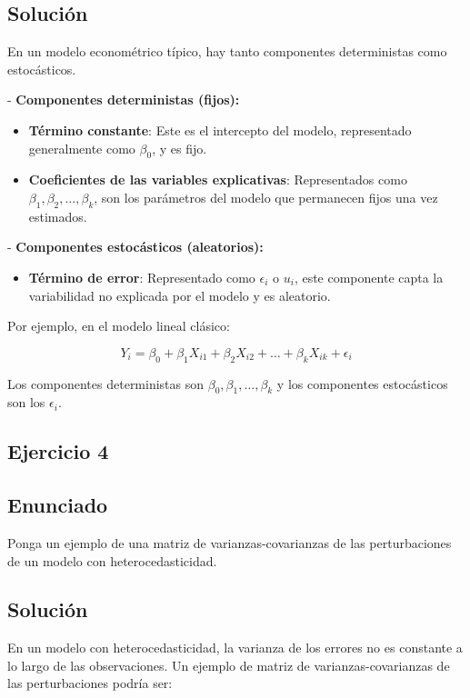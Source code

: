 \documentclass[a4paper,12pt]{article}
\begin{document}
\subsection*{Solución}
En un modelo econométrico típico, hay tanto componentes deterministas como estocásticos.

- \textbf{Componentes deterministas (fijos):}
\begin{itemize}
    \item \textbf{Término constante}: Este es el intercepto del modelo, representado generalmente como \(\beta_0\), y es fijo.
    \item \textbf{Coeficientes de las variables explicativas}: Representados como \(\beta_1, \beta_2, \ldots, \beta_k\), son los parámetros del modelo que permanecen fijos una vez estimados.
\end{itemize}

- \textbf{Componentes estocásticos (aleatorios):}
  \begin{itemize}
    \item \textbf{Término de error}: Representado como \(\epsilon_i\) o \(u_i\), este componente capta la variabilidad no explicada por el modelo y es aleatorio.
  \end{itemize}

Por ejemplo, en el modelo lineal clásico:



\[ 
Y_i = \beta_0 + \beta_1 X_{i1} + \beta_2 X_{i2} + \ldots + \beta_k X_{ik} + \epsilon_i 
\]



Los componentes deterministas son \(\beta_0, \beta_1, \ldots, \beta_k\) y los componentes estocásticos son los \(\epsilon_i\).

\subsection{Ejercicio 4}
\subsection*{Enunciado}
Ponga un ejemplo de una matriz de varianzas-covarianzas de las perturbaciones de un modelo con heterocedasticidad.

\subsection*{Solución}
En un modelo con heterocedasticidad, la varianza de los errores no es constante a lo largo de las observaciones. Un ejemplo de matriz de varianzas-covarianzas de las perturbaciones podría ser:
\end{document}
